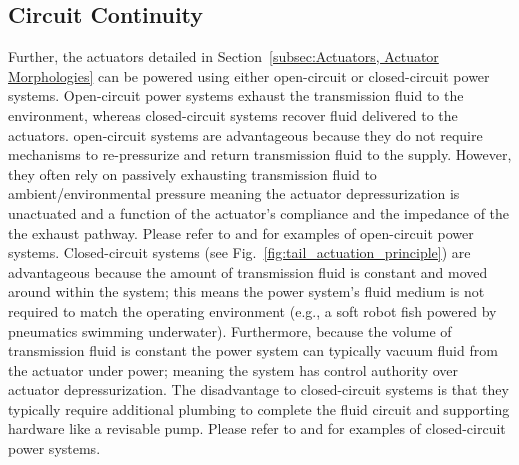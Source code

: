 \subsection{Circuit Continuity}
Further, the actuators detailed in Section~\ref{subsec:Actuators, Actuator Morphologies} can be powered using either open-circuit or closed-circuit power systems.
Open-circuit power systems exhaust the transmission fluid to the environment, whereas closed-circuit systems recover fluid delivered to the actuators.
open-circuit systems are advantageous because they do not require mechanisms to re-pressurize and return transmission fluid to the supply.
However, they often rely on passively exhausting transmission fluid to ambient/environmental pressure meaning the actuator depressurization is unactuated and a function of the actuator's compliance and the impedance of the the exhaust pathway.
Please refer to \citet{marchese2011soft} and \citet{marchese2014autonomous} for examples of open-circuit power systems.
Closed-circuit systems (see Fig.~\ref{fig:tail_actuation_principle}) are advantageous because the amount of transmission fluid is constant and moved around within the system; this means the power system's fluid medium is not required to match the operating environment (e.g., a soft robot fish powered by pneumatics swimming underwater).
Furthermore, because the volume of transmission fluid is constant the power system can typically vacuum fluid from the actuator under power; meaning the system has control authority over actuator depressurization.
The disadvantage to closed-circuit systems is that they typically require additional plumbing to complete the fluid circuit and supporting hardware like a revisable pump.
Please refer to \cite{marchese2014design, katzschmann2014hydraulic} and \cite{marchese2015design} for examples of closed-circuit power systems.

